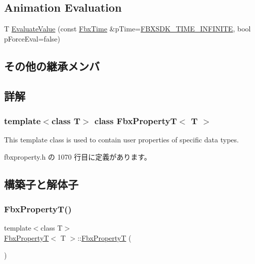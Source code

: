 \subsection*{Animation Evaluation}
\begin{DoxyCompactItemize}
\item 
T \hyperlink{class_fbx_property_t_a07f3d2e638b5f65838338eb03296c3f9}{Evaluate\+Value} (const \hyperlink{class_fbx_time}{Fbx\+Time} \&p\+Time=\hyperlink{fbxtime_8h_a1e6db3fe0f84f0b7daa775739f93526f}{F\+B\+X\+S\+D\+K\+\_\+\+T\+I\+M\+E\+\_\+\+I\+N\+F\+I\+N\+I\+TE}, bool p\+Force\+Eval=false)
\end{DoxyCompactItemize}
\subsection*{その他の継承メンバ}


\subsection{詳解}
\subsubsection*{template$<$class T$>$\newline
class Fbx\+Property\+T$<$ T $>$}

This template class is used to contain user properties of specific data types. 

 fbxproperty.\+h の 1070 行目に定義があります。



\subsection{構築子と解体子}
\mbox{\label{class_fbx_property_t_a60e994b93527d29bf782be402dfe430f}} 
\subsubsection{\texorpdfstring{Fbx\+Property\+T()}{FbxPropertyT()}\hspace{0.1cm}{\footnotesize\ttfamily [1/2]}}
{\footnotesize\ttfamily template$<$class T$>$ \\
\hyperlink{class_fbx_property_t}{Fbx\+PropertyT}$<$ T $>$\+::\hyperlink{class_fbx_property_t}{Fbx\+PropertyT} (\begin{DoxyParamCaption}{ }\end{DoxyParamCaption})\hspace{0.3cm}{\ttfamily [inline]}}



